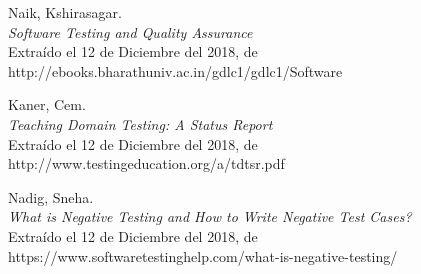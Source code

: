 \begin{thebibliography}{99}
 Naik, Kshirasagar.\\
\emph{Software Testing and Quality Assurance}\\
Extraído el 12 de Diciembre del 2018, de\\
http://ebooks.bharathuniv.ac.in/gdlc1/gdlc1/Software%

 Kaner, Cem.\\
\emph{Teaching Domain Testing: A Status Report}\\
Extraído el 12 de Diciembre del 2018, de\\
http://www.testingeducation.org/a/tdtsr.pdf

 Nadig, Sneha.\\
\emph{What is Negative Testing and How to Write Negative Test Cases?}\\
Extraído el 12 de Diciembre del 2018, de\\
https://www.softwaretestinghelp.com/what-is-negative-testing/

\end{thebibliography}

